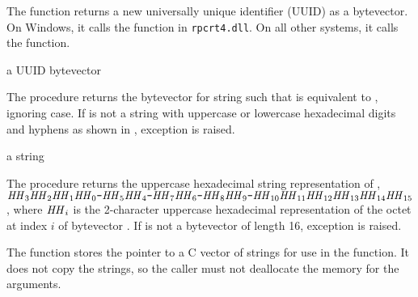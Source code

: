 \begin{function}
\end{function}

The  function returns a new universally unique
identifier (UUID) as a bytevector. On Windows, it calls the
 function in \texttt{rpcrt4.dll}. On all other
systems, it calls the  function.

\begin{procedure}
\end{procedure}
\returns{} a UUID bytevector

The  procedure returns the bytevector 
for string  such that  is
equivalent to , ignoring case. If  is not a string with
uppercase or lowercase hexadecimal digits and hyphens as shown in
, exception 
is raised.

\begin{procedure}
\end{procedure}
\returns{} a string

The  procedure returns the uppercase hexadecimal
string representation of ,
$\var{HH}_3\var{HH}_2\var{HH}_1\var{HH}_0\code{-}\var{HH}_5\var{HH}_4\code{-}\var{HH}_7\var{HH}_6\code{-}\var{HH}_8\var{HH}_9\code{-}\var{HH}_{10}\var{HH}_{11}\var{HH}_{12}\var{HH}_{13}\var{HH}_{14}\var{HH}_{15}$,
where $\var{HH}_i$ is the 2-character uppercase hexadecimal
representation of the octet at index $i$ of bytevector .  If
 is not a bytevector of length 16, exception
 is raised.

\begin{function}
\end{function}

The  function stores the  pointer to a
C vector of  strings for use in the 
function. It does not copy the strings, so the caller must not
deallocate the memory for the arguments.

\begin{function}
\end{function}

